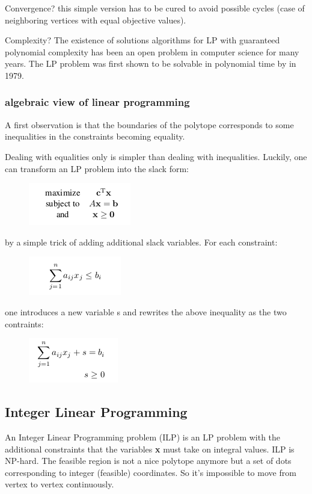 \documentclass[11pt]{article}
\begin{document}
Convergence? this simple version has to be cured to avoid possible cycles (case of neighboring vertices with equal objective values). 

Complexity? The existence of solutions algorithms for LP with guaranteed polynomial complexity has been an open problem in computer science for many years. The LP problem was first shown to be solvable in polynomial time by in 1979.

\subsubsection{algebraic view of linear programming}
A first observation is that the boundaries of the polytope corresponds to some inequalities in the constraints becoming equality. 

Dealing with equalities only is simpler than dealing with inequalities. Luckily, one can transform an LP problem into the slack form:

\begin{figure}[H]
\includegraphics[scale=0.60]{alp}
\centering
\end{figure}

by a simple trick of adding additional slack variables. For each constraint:

\begin{figure}[H]
\includegraphics[scale=0.60]{slack}
\centering
\end{figure}

one introduces a new variable s and rewrites the above inequality as the two contraints:

\begin{figure}[H]
\includegraphics[scale=0.60]{ineq}
\centering
\end{figure}

\subsection{Integer Linear Programming} 
An Integer Linear Programming problem (ILP) is an LP problem with the additional constraints that the variables \textbf{x} must take on integral values. ILP is NP-hard. The feasible region is not a nice  polytope anymore but a set of dots corresponding to integer (feasible)
coordinates. So it's impossible to move from vertex to vertex continuously.
\end{document}
